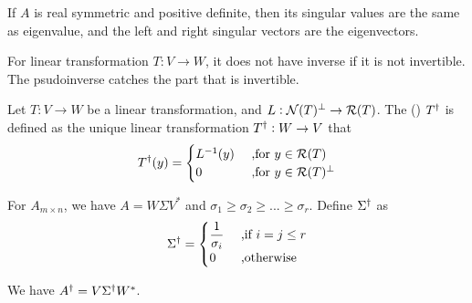 \begin{theorem}
    If $A$ is real symmetric and positive definite, then its singular values are the same as eigenvalue, and the left and right singular vectors are the eigenvectors.    
\end{theorem}


For linear transformation $T: V \rightarrow W$, it does not have inverse if it is not invertible. The psudoinverse catches the part that is invertible.

\begin{definition}[Pseudoinverse]
    Let $T: V \rightarrow W$ be a linear transformation, and $L: \mathcal{N}(T)^\perp \rightarrow \mathcal{R}(T)$. The  () ${T}^\dagger$ is defined as the unique linear transformation ${T}^\dagger: W \rightarrow V$ that
    \begin{equation}
        {T}^\dagger(y) = \begin{aligned}
            \begin{cases}
                {L}^{-1}(y) & \text{ ,for } y \in \mathcal{R}(T) \\
                0 & \text{ ,for } y \in \mathcal{R}(T)^\perp
            \end{cases}
        \end{aligned}
    \end{equation}
    
    
    For $A_{m \times n}$, we have $A = W \Sigma V^*$ and $\sigma_1 \geq \sigma_2 \geq ... \geq \sigma_r$. Define ${\Sigma}^\dagger$ as 
    \begin{equation}
        {\Sigma}^\dagger = \begin{aligned}
            \begin{cases}
                \displaystyle \frac{1}{\sigma_i} & \text{ ,if } i = j \leq r \\
                0 & \text{ ,otherwise}
            \end{cases}
        \end{aligned}
    \end{equation}
    
    We have ${A}^\dagger = V {\Sigma}^\dagger W^*$.
\end{definition}
